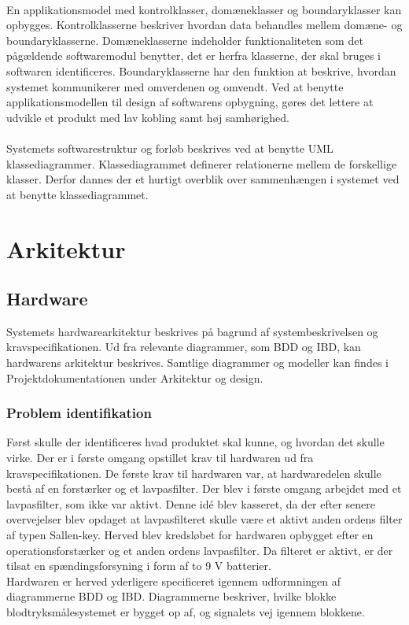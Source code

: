 \\
En applikationsmodel med kontrolklasser, domæneklasser og boundaryklasser kan opbygges. Kontrolklasserne beskriver hvordan data behandles mellem domæne- og boundaryklasserne. Domæneklasserne indeholder funktionaliteten som det pågældende softwaremodul benytter, det er herfra klasserne, der skal bruges i softwaren identificeres. Boundaryklasserne har den funktion at beskrive, hvordan systemet kommunikerer med omverdenen og omvendt. Ved at benytte applikationsmodellen til design af softwarens opbygning, gøres det lettere at udvikle et produkt med lav kobling samt høj samhørighed. \\
\\
Systemets softwarestruktur og forløb beskrives ved at benytte UML klassediagrammer. Klassediagrammet definerer relationerne mellem de forskellige klasser. Derfor dannes der et hurtigt overblik over sammenhængen i systemet ved at benytte klassediagrammet.  
\section{Arkitektur}
\subsection{Hardware}
Systemets hardwarearkitektur beskrives på bagrund af systembeskrivelsen og kravspecifikationen. Ud fra relevante diagrammer, som BDD og IBD, kan hardwarens arkitektur beskrives. Samtlige diagrammer og modeller kan findes i Projektdokumentationen under Arkitektur og design. 
\subsubsection{Problem identifikation}
Først skulle der identificeres hvad produktet skal kunne, og hvordan det skulle virke. Der er i første omgang opstillet krav til hardwaren ud fra kravspecifikationen. De første krav til hardwaren var, at hardwaredelen skulle bestå af en forstærker og et lavpasfilter. Der blev i første omgang arbejdet med et lavpasfilter, som ikke var aktivt. Denne idé blev kasseret, da der efter senere overvejelser blev opdaget at lavpasfilteret skulle være et aktivt anden ordens filter af typen Sallen-key. Herved blev kredsløbet for hardwaren opbygget efter en operationsforstærker og et anden ordens lavpasfilter. Da filteret er aktivt, er der tilsat en spændingsforsyning i form af to 9 V batterier. \\
Hardwaren er herved yderligere specificeret igennem udformningen af diagrammerne BDD og IBD. Diagrammerne beskriver, hvilke blokke blodtryksmålesystemet er bygget op af, og signalets vej igennem blokkene.
